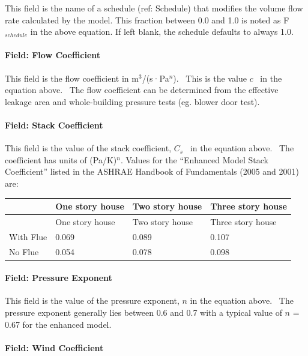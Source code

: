 This field is the name of a schedule (ref: Schedule) that modifies the volume flow rate calculated by the model. This fraction between 0.0 and 1.0 is noted as F\(_{schedule}\) in the above equation. If left blank, the schedule defaults to always 1.0.

\paragraph{Field: Flow Coefficient}\label{field-flow-coefficient}

This field is the flow coefficient in m\(^{3}\)/(s·Pa\(^{n}\)).~ This is the value \(c\) ~in the equation above.~ The flow coefficient can be determined from the effective leakage area and whole-building pressure tests (eg. blower door test).

\paragraph{Field: Stack Coefficient}\label{field-stack-coefficient-1}

This field is the value of the stack coefficient, \({C_s}\) ~in the equation above.~ The coefficient has units of (Pa/K)\(^{n}\). Values for the ``Enhanced Model Stack Coefficient'' listed in the ASHRAE Handbook of Fundamentals (2005 and 2001) are:

\begin{longtable}[c]{@{}llll@{}}
\toprule
~ & One story house & Two story house & Three story house \tabularnewline
\midrule
\endfirsthead

\toprule
~ & One story house & Two story house & Three story house \tabularnewline
\midrule
\endhead

With Flue & 0.069 & 0.089 & 0.107 \tabularnewline
No Flue & 0.054 & 0.078 & 0.098 \tabularnewline
\bottomrule
\end{longtable}

\paragraph{Field: Pressure Exponent}\label{field-pressure-exponent}

This field is the value of the pressure exponent, $n$ in the equation above.~ The pressure exponent generally lies between 0.6 and 0.7 with a typical value of $n$ = 0.67 for the enhanced model.

\paragraph{Field: Wind Coefficient}\label{field-wind-coefficient-1}

